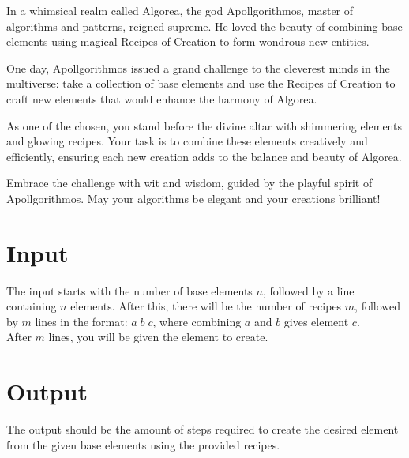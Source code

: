 In a whimsical realm called Algorea, the god Apollgorithmos, master of algorithms and patterns, reigned supreme. He loved the beauty of combining base elements using magical Recipes of Creation to form wondrous new entities.

One day, Apollgorithmos issued a grand challenge to the cleverest minds in the multiverse: take a collection of base elements and use the Recipes of Creation to craft new elements that would enhance the harmony of Algorea.

As one of the chosen, you stand before the divine altar with shimmering elements and glowing recipes. Your task is to combine these elements creatively and efficiently, ensuring each new creation adds to the balance and beauty of Algorea.

Embrace the challenge with wit and wisdom, guided by the playful spirit of Apollgorithmos. May your algorithms be elegant and your creations brilliant!

\section*{Input}
The input starts with the number of base elements \(n\), followed by a line containing \(n\) elements. After this, there will be the number of recipes \(m\), followed by \(m\) lines in the format: \(a\;b\;c\), where combining \(a\) and \(b\) gives element \(c\).\\
After \(m\) lines, you will be given the element to create.

\section*{Output}
The output should be the amount of steps required to create the desired element from the given base elements using the provided recipes.
